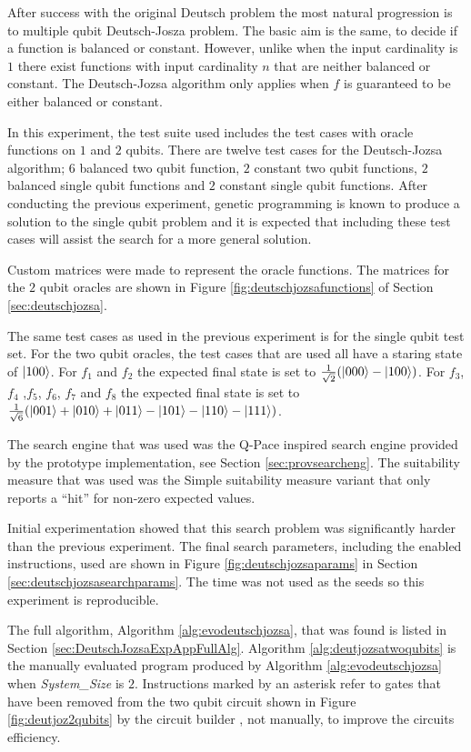 After success with the original Deutsch problem the most natural progression is to multiple qubit Deutsch-Josza problem.
The basic aim is the same, to decide if a function is balanced or constant.
However, unlike when the input cardinality is $1$ there exist functions with input cardinality $n$ that are neither balanced or constant.
The Deutsch-Jozsa algorithm only applies when $f$ is guaranteed to be either balanced or constant.

In this experiment, the test suite used includes the test cases with oracle functions on $1$ and $2$ qubits.
There are twelve test cases for the Deutsch-Jozsa algorithm; $6$ balanced two qubit function, $2$ constant two qubit functions, $2$ balanced single qubit functions and $2$ constant single qubit functions.
After conducting the previous experiment, genetic programming is known to produce a solution to the single qubit problem and it is expected that including these test cases will assist the search for a more general solution.

Custom matrices were made to represent the oracle functions.
The matrices for the $2$ qubit oracles are shown in Figure \ref{fig:deutschjozsafunctions} of Section \ref{sec:deutschjozsa}.

The same test cases as used in the previous experiment is for the single qubit test set.
For the two qubit oracles, the test cases that are used all have a staring state of $\left\vert{100}\right\rangle$.
For $f_1$ and $f_2$ the expected final state is set to $\frac{1}{\sqrt{2}}(\left\vert{000}\right\rangle-\left\vert{100}\right\rangle)$.
For $f_3$, $f_4$ ,$f_5$, $f_6$, $f_7$ and $f_8$ the expected final state is set to $\frac{1}{\sqrt{6}}(\left\vert{001}\right\rangle+\left\vert{010}\right\rangle+\left\vert{011}\right\rangle-\left\vert{101}\right\rangle-\left\vert{110}\right\rangle-\left\vert{111}\right\rangle)$.

The search engine that was used was the Q-Pace inspired search engine provided by the prototype implementation, see Section \ref{sec:provsearcheng}.
The suitability measure that was used was the Simple suitability measure variant that only reports a ``hit'' for non-zero expected values.

Initial experimentation showed that this search problem was significantly harder than the previous experiment.
The final search parameters, including the enabled instructions, used are shown in Figure \ref{fig:deutschjozsaparams} in Section \ref{sec:deutschjozsasearchparams}.
The time was not used as the seeds so this experiment is reproducible.

The full algorithm, Algorithm \ref{alg:evodeutschjozsa}, that was found is listed in Section \ref{sec:DeutschJozsaExpAppFullAlg}.
Algorithm \ref{alg:deutjozsatwoqubits} is the manually evaluated program produced by Algorithm \ref{alg:evodeutschjozsa} when \emph{System\_Size} is $2$.
Instructions marked by an asterisk refer to gates that have been removed from the two qubit circuit shown in Figure \ref{fig:deutjoz2qubits} by the circuit builder , not manually, to improve the circuits efficiency.

